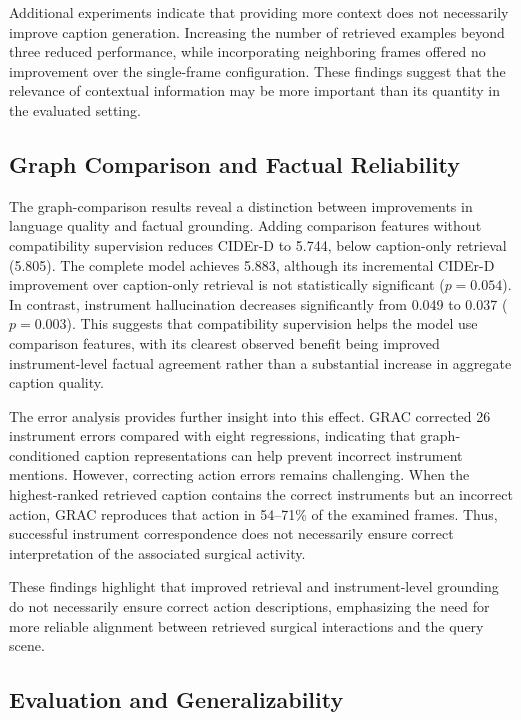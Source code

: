 \documentclass[11pt]{article}
\begin{document}
Additional experiments indicate that providing more context does not necessarily improve caption generation. Increasing the number of retrieved examples beyond three reduced performance, while incorporating neighboring frames offered no improvement over the single-frame configuration. These findings suggest that the relevance of contextual information may be more important than its quantity in the evaluated setting.

\subsection{Graph Comparison and Factual Reliability}\label{subsec6.2}

The graph-comparison results reveal a distinction between improvements in language quality and factual grounding. Adding comparison features without compatibility supervision reduces CIDEr-D to 5.744, below caption-only retrieval (5.805). The complete model achieves 5.883, although its incremental CIDEr-D improvement over caption-only retrieval is not statistically significant ($p=0.054$). In contrast, instrument hallucination decreases significantly from 0.049 to 0.037 ($p=0.003$). This suggests that compatibility supervision helps the model use comparison features, with its clearest observed benefit being improved instrument-level factual agreement rather than a substantial increase in aggregate caption quality.

The error analysis provides further insight into this effect. GRAC corrected 26 instrument errors compared with eight regressions, indicating that graph-conditioned caption representations can help prevent incorrect instrument mentions. However, correcting action errors remains challenging. When the highest-ranked retrieved caption contains the correct instruments but an incorrect action, GRAC reproduces that action in 54--71\% of the examined frames. Thus, successful instrument correspondence does not necessarily ensure correct interpretation of the associated surgical activity.

These findings highlight that improved retrieval and instrument-level grounding do not necessarily ensure correct action descriptions, emphasizing the need for more reliable alignment between retrieved surgical interactions and the query scene.

\subsection{Evaluation and Generalizability}\label{subsec6.3}
\end{document}

